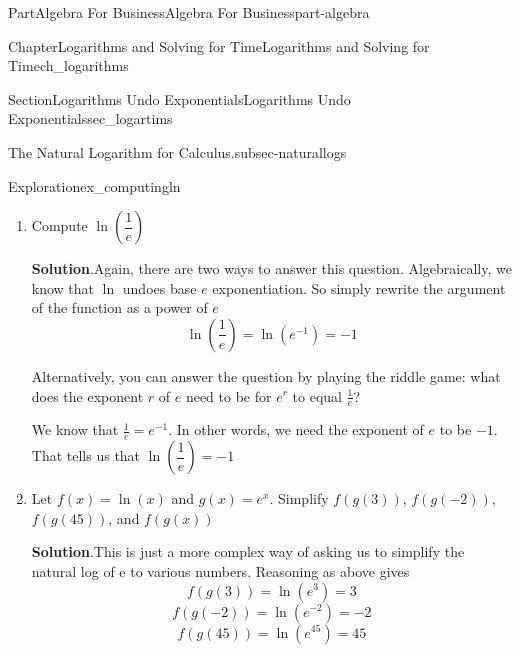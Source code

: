 \documentclass[oneside,10pt,]{tufte-book}
\newcommand{\blocktitlefont}{\relax}
\numberwithin{equation}{chapter}
\begin{document}
\begin{partptx}{Part}{Algebra For Business}{}{Algebra For Business}{}{}{part-algebra}
\begin{chapterptx}{Chapter}{Logarithms and Solving for Time}{}{Logarithms and Solving for Time}{}{}{ch_logarithms}
\begin{sectionptx}{Section}{Logarithms Undo Exponentials}{}{Logarithms Undo Exponentials}{}{}{sec_logartims}
\begin{paragraphs}{The Natural Logarithm for Calculus.}{subsec-naturallogs}
\begin{exploration}{Exploration}{}{ex_computingln}
\begin{enumerate}[font=\bfseries,label=(\alph*),ref=\alph*]
\noindent\textbf{\blocktitlefont Solution}.\hypertarget{ex_computingln-1-2}{}\quad{}There are two ways to answer this question.  Algebraically, we know that \(\ln\) undoes base \(e\) exponentiation.  So simply rewrite the argument of the function as a power of \(e\)%
\begin{equation*}
\ln(\sqrt{e}) = \ln(e^{1/2}) = \frac{1}{2}
\end{equation*}
%
\par
Alternatively, you can answer the question by playing the riddle game: what does the exponent \(r\) of \(e\) need to be for \(e^{r}\) to equal \(\sqrt{e}\)?%
\par
We know that \(\sqrt{e} = e^{1/2}\).  In other words, we need the exponent of \(e\) to be \(\frac{1}{2}\).  That tells us that \(\ln(\sqrt{e}) = \frac{1}{2}\)%
\item{}Compute \(\ln\left(\dfrac{1}{e}\right)\)%
\par\smallskip%
\noindent\textbf{\blocktitlefont Solution}.\hypertarget{ex_computingln-2-2}{}\quad{}Again, there are two ways to answer this question.  Algebraically, we know that \(\ln\) undoes base \(e\) exponentiation.  So simply rewrite the argument of the function as a power of \(e\)%
\begin{equation*}
\ln\left(\dfrac{1}{e}\right) = \ln(e^{-1}) = -1
\end{equation*}
%
\par
Alternatively, you can answer the question by playing the riddle game: what does the exponent \(r\) of \(e\) need to be for \(e^{r}\) to equal \(\frac{1}{e}\)?%
\par
We know that \(\frac{1}{e} = e^{-1}\).  In other words, we need the exponent of \(e\) to be \(-1\).  That tells us that \(\ln\left(\dfrac{1}{e}\right) = -1\)%
\item{}Let \(f(x) = \ln(x)\) and \(g(x) = e^x\). Simplify \(f(g(3))\), \(f(g(-2))\), \(f(g(45))\), and \(f(g(x))\)%
\par\smallskip%
\noindent\textbf{\blocktitlefont Solution}.\hypertarget{ex_computingln-3-2}{}\quad{}This is just a more complex way of asking us to simplify the natural log of e to various numbers. Reasoning as above gives%
\begin{equation*}
f(g(3)) = \ln(e^3) = 3
\end{equation*}
%
\begin{equation*}
f(g(-2)) = \ln(e^{-2}) = -2
\end{equation*}
%
\begin{equation*}
f(g(45)) = \ln(e^{45}) = 45

\end{equation*}
\end{enumerate}
\end{exploration}
\end{paragraphs}
\end{sectionptx}
\end{chapterptx}
\end{partptx}
\end{document}
